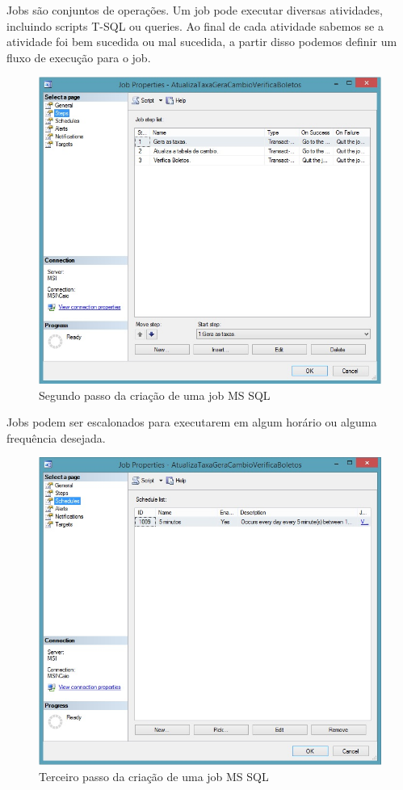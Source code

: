 \documentclass[conference]{IEEEtran}
\begin{document}
  	Jobs são conjuntos de operações. Um job pode executar diversas atividades, incluindo scripts T-SQL ou queries. Ao final de cada atividade sabemos se a atividade foi bem sucedida ou mal sucedida, a partir disso podemos definir um fluxo de execução para o job.
  	
    \begin{figure}[!t]
      \centering
  	  \includegraphics[scale=0.45]{img/job2.jpg}
      \caption{Segundo passo da criação de uma job MS SQL}
    \end{figure}

  	Jobs podem ser escalonados para executarem em algum horário ou alguma frequência desejada.

    \begin{figure}[!t]
      \centering
  	  \includegraphics[scale=0.45]{img/job3.jpg}
      \caption{Terceiro passo da criação de uma job MS SQL}
    \end{figure}
\end{document}
